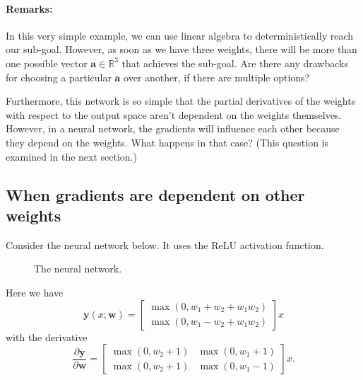 \documentclass{article}
\renewcommand\vec{\mathbf}
\begin{document}
\paragraph{Remarks:}
In this very simple example, we can use linear algebra to deterministically reach our sub-goal. 
However, as soon as we have three weights, there will be more than one possible vector $\vec{a} \in \mathbb{R}^3$ that achieves the sub-goal. 
Are there any drawbacks for choosing a particular $\vec{a}$ over another, if there are multiple options?

Furthermore, this network is so simple that the partial derivatives of the weights with respect to the output space aren't dependent on the weights themselves. However, in a  neural network, the gradients will influence each other because they depend on the weights. What happens in that case? (This question is examined in the next section.)

\subsection{When gradients are dependent on other weights}
Consider the neural network below. It uses the ReLU activation function.

\begin{figure}[h]
    \begin{center}
    \end{center}
    \caption{The neural network.}
\end{figure}

Here we have
\begin{equation*}
    \vec{y}(x; \vec{w}) = 
    \begin{bmatrix}
        \max \left( 0, w_1 + w_2 + w_1 w_2 \right) \\
        \max \left( 0, w_1 - w_2 + w_1 w_2 \right)
    \end{bmatrix}
    x
\end{equation*}
with the derivative
\begin{equation*}
    \frac{\partial \vec{y}}{\partial \vec{w}}
    =
    \begin{bmatrix}
        \max(0, w_2 + 1) & \max(0, w_1 + 1) \\
        \max(0, w_2 + 1) & \max(0, w_1 - 1)
    \end{bmatrix}
    x.
\end{equation*}
\end{document}
